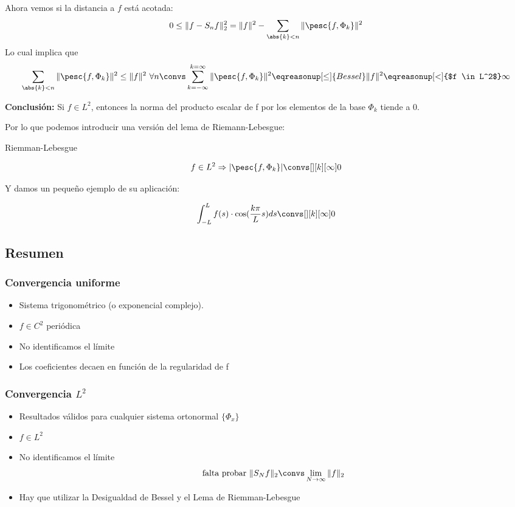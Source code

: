 			Ahora vemos si la distancia a $f$ está acotada:
			$$0 \leq \| f - S_n f\|_2^2 = \|f\|^2 - \sum\limits_{\abs{k}<n} \| \pesc{f, \Phi_k} \|^2$$
			Lo cual implica que
			$$\sum\limits_{\abs{k}<n} \| \pesc{f, \Phi_k} \|^2 \leq \|f\|^2 \ \forall n \convs \sum\limits_{k=-\infty}^{k=\infty} \| \pesc{f, \Phi_k} \|^2 \eqreasonup[\leq]{Bessel} \|f\|^2 \eqreasonup[<]{$f \in L^2$} \infty$$

			{\bf Conclusión:}
			Si $f \in L^2$, entonces la norma del producto escalar de f por los elementos de la base $\Phi_k$ tiende a 0.

			Por lo que podemos introducir una versión del lema de Riemann-Lebesgue:

			\begin{lemma}{Riemman-Lebesgue}

				\[ f \in L^2 \Rightarrow |\pesc{f, \Phi_k}| \convs[ ][k][\infty] 0\]

			\end{lemma}

			Y damos un pequeño ejemplo de su aplicación:
			\begin{example}
				$$ \int_{-L}^{L} f(s) \cdot \cos(\frac{k\pi}{L}s) ds \convs[ ][k][\infty] 0$$
			\end{example}

	\subsection{Resumen}

		\subsubsection*{Convergencia uniforme}

			\begin{itemize}
				\item Sistema trigonométrico (o exponencial complejo).
				\item $f \in C^2$ periódica
				\item No identificamos el límite
				\item Los coeficientes decaen en función de la regularidad de f
			\end{itemize}

		\subsubsection*{Convergencia $L^2$}

			\begin{itemize}
				\item Resultados válidos para cualquier sistema ortonormal $\{ \Phi_x \}$
				\item $f \in L^2$
				\item No identificamos el límite
				\[\text{falta probar }\|S_N f\|_2 \convs \lim_{N \to \infty} \|f\|_2\]
				\item Hay que utilizar la Desigualdad de Bessel y el Lema de Riemman-Lebesgue

			\end{itemize}

